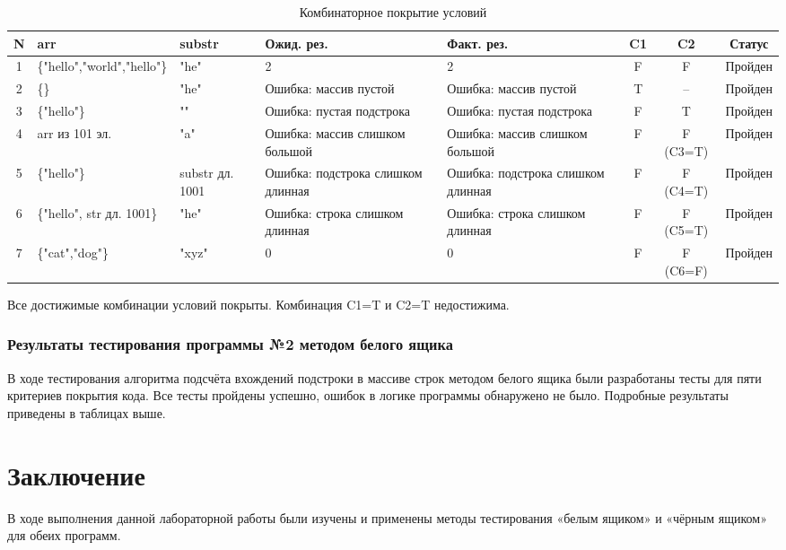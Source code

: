 \documentclass{article}[14pt]
\begin{document}
\begin{table}[H]
\centering
\caption{Комбинаторное покрытие условий}
\begin{tabularx}{\textwidth}{|c|X|X|X|X|c|c|c|}
\hline
\textbf{N} & \textbf{arr} & \textbf{substr} & \textbf{Ожид. рез.} & \textbf{Факт. рез.} & \textbf{C1} & \textbf{C2} & \textbf{Статус} \\
\hline
1 & \{"hello","world","hello"\} & "he" & 2 & 2 & F & F & Пройден \\
\hline
2 & \{\} & "he" & Ошибка: массив пустой & Ошибка: массив пустой & T & -- & Пройден \\
\hline
3 & \{"hello"\} & "" & Ошибка: пустая подстрока & Ошибка: пустая подстрока & F & T & Пройден \\
\hline
4 & arr из 101 эл. & "a" & Ошибка: массив слишком большой & Ошибка: массив слишком большой & F & F (C3=T) & Пройден \\
\hline
5 & \{"hello"\} & substr дл. 1001 & Ошибка: подстрока слишком длинная & Ошибка: подстрока слишком длинная & F & F (C4=T) & Пройден \\
\hline
6 & \{"hello", str дл. 1001\} & "he" & Ошибка: строка слишком длинная & Ошибка: строка слишком длинная & F & F (C5=T) & Пройден \\
\hline
7 & \{"cat","dog"\} & "xyz" & 0 & 0 & F & F (C6=F) & Пройден \\
\hline
\end{tabularx}
\end{table}

Все достижимые комбинации условий покрыты. Комбинация C1=T и C2=T недостижима.

\subsubsection{Результаты тестирования программы №2 методом белого ящика}

В ходе тестирования алгоритма подсчёта вхождений подстроки в массиве строк методом белого ящика
были разработаны тесты для пяти критериев покрытия кода. Все тесты пройдены успешно, ошибок в
логике программы обнаружено не было. Подробные результаты приведены в таблицах выше.

\pagebreak

\section{Заключение}

В ходе выполнения данной лабораторной работы были изучены и применены методы тестирования
«белым ящиком» и «чёрным ящиком» для обеих программ.
\end{document}
